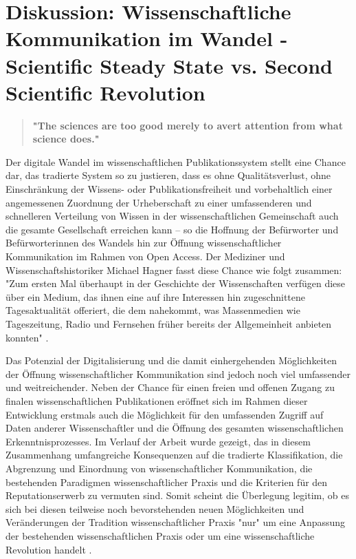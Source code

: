\chapter{Diskussion: Wissenschaftliche Kommunikation im Wandel - Scientific Steady State vs. Second Scientific Revolution}

\begin{quote}
\textbf{"The sciences are too good merely to avert attention from what science does."}
\end{quote} \cite{Kittler_2004}

Der digitale Wandel im wissenschaftlichen Publikationssystem stellt eine Chance dar, das tradierte System so zu justieren, dass es ohne Qualitätsverlust, ohne Einschränkung der Wissens- oder Publikationsfreiheit und vorbehaltlich einer angemessenen Zuordnung der Urheberschaft zu einer umfassenderen und schnelleren Verteilung von Wissen in der wissenschaftlichen Gemeinschaft auch die gesamte Gesellschaft erreichen kann – so die Hoffnung der Befürworter und Befürworterinnen des Wandels hin zur Öffnung wissenschaftlicher Kommunikation im Rahmen von Open Access. Der Mediziner und Wissenschaftshistoriker Michael Hagner fasst diese Chance wie folgt zusammen: "Zum ersten Mal überhaupt in der Geschichte der Wissenschaften verfügen diese über ein Medium, das ihnen eine auf ihre Interessen hin zugeschnittene Tagesaktualität offeriert, die dem nahekommt, was Massenmedien wie Tageszeitung, Radio und Fernsehen früher bereits der Allgemeinheit anbieten konnten" \cite{Hagner_2015}.

Das Potenzial der Digitalisierung und die damit einhergehenden Möglichkeiten der Öffnung wissenschaftlicher Kommunikation sind jedoch noch viel umfassender und weitreichender. Neben der Chance für einen freien und offenen Zugang zu finalen wissenschaftlichen Publikationen eröffnet sich im Rahmen dieser Entwicklung erstmals auch die Möglichkeit für den umfassenden Zugriff auf Daten anderer Wissenschaftler und die Öffnung des gesamten wissenschaftlichen Erkenntnisprozesses. Im Verlauf der Arbeit wurde gezeigt, das in diesem Zusammenhang umfangreiche Konsequenzen auf die tradierte Klassifikation, die Abgrenzung und Einordnung von wissenschaftlicher Kommunikation, die bestehenden Paradigmen wissenschaftlicher Praxis und die Kriterien für den Reputationserwerb zu vermuten sind. Somit scheint die Überlegung legitim, ob es sich bei diesen teilweise noch bevorstehenden neuen Möglichkeiten und Veränderungen der Tradition wissenschaftlicher Praxis "nur" um eine Anpassung der bestehenden wissenschaftlichen Praxis oder um eine wissenschaftliche Revolution handelt \cite{Kuhn_2012}.

